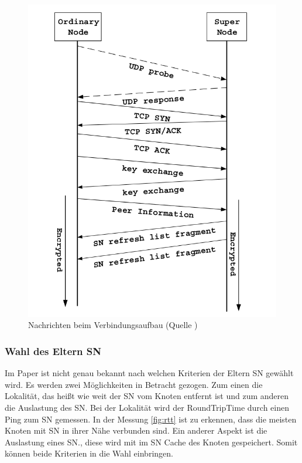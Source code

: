 \begin{figure}
\includegraphics[scale=0.3]{gfx/join}
\caption{Nachrichten beim Verbindungsaufbau (Quelle \cite{liang2006fasttrack})}
\label{fig:join}
\end{figure}

\subsubsection{Wahl des Eltern SN}
\label{subsubsec:wElternSN}

Im Paper \cite{liang2006fasttrack} ist nicht genau bekannt nach welchen Kriterien der Eltern SN gewählt wird. 
Es werden zwei Möglichkeiten in Betracht gezogen.
Zum einen die Lokalität, das heißt wie weit der SN vom Knoten entfernt ist und zum anderen die Auslastung des SN.
Bei der Lokalität wird der RoundTripTime durch einen Ping zum SN gemessen.
In der Messung \ref{fig:rtt} ist zu erkennen, dass die meisten Knoten mit SN in ihrer Nähe verbunden sind.
Ein anderer Aspekt ist die Auslastung eines SN., diese wird mit im SN Cache des Knoten gespeichert.
Somit können beide Kriterien in die Wahl einbringen.

